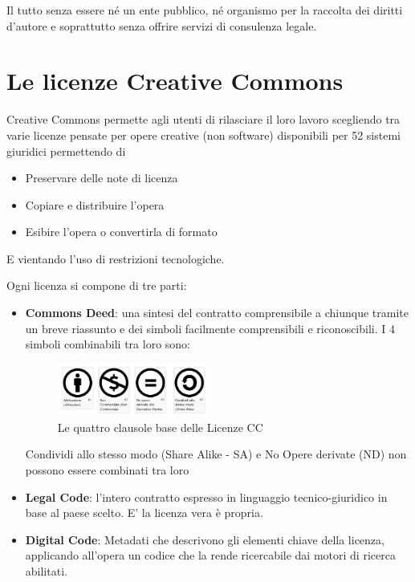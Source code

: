 Il tutto senza essere né un ente pubblico, né organismo per la raccolta dei diritti d'autore e soprattutto senza offrire servizi di consulenza legale.

\section{Le licenze Creative Commons}

Creative Commons permette agli utenti di rilasciare il loro lavoro scegliendo tra varie licenze pensate per opere creative (non software) disponibili per 52 sistemi giuridici permettendo di 

\begin{itemize}
\item Preservare delle note di licenza
\item Copiare e distribuire l'opera
\item Esibire l'opera o convertirla di formato
\end{itemize}

E vientando l'uso di restrizioni tecnologiche.

Ogni licenza si compone di tre parti:
\begin{itemize}
\item \textbf{Commons Deed}: una sintesi del contratto comprensibile a chiunque tramite un breve riassunto e dei simboli facilmente comprensibili e riconoscibili. I 4 simboli combinabili tra loro sono:

\begin{figure}[htbp]
\centering
\includegraphics[width=50mm]{images/CC_Deed}
\caption{Le quattro clausole base delle Licenze CC}
\end{figure}

Condividi allo stesso modo (Share Alike - SA) e No Opere derivate (ND) non possono essere combinati tra loro

\item \textbf{Legal Code}: l’intero contratto espresso in linguaggio tecnico-giuridico in base al paese scelto. E' la licenza vera è propria.
\item \textbf{Digital Code}: Metadati che descrivono gli elementi chiave della licenza, applicando all'opera un codice che la rende ricercabile dai motori di ricerca abilitati.
\end{itemize}

